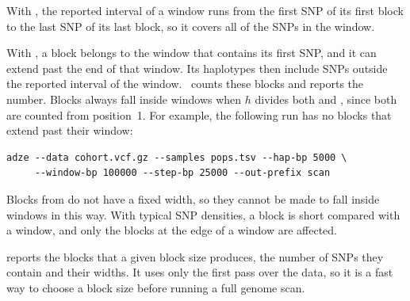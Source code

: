 With , the reported interval of a window runs from the
first SNP of its first block to the last SNP of its last block, so it covers
all of the SNPs in the window.

With , a block belongs to the window that contains its first
SNP, and it can extend past the end of that window. Its haplotypes then
include SNPs outside the reported interval of the window. \prog\ counts these
blocks and reports the number. Blocks always fall inside windows when
 $h$ divides both  and ,
since both are counted from position~1. For example, the following run has no
blocks that extend past their window:

\begin{Verbatim}[frame=single,fontsize=\small]
adze --data cohort.vcf.gz --samples pops.tsv --hap-bp 5000 \
     --window-bp 100000 --step-bp 25000 --out-prefix scan
\end{Verbatim}

\noindent Blocks from  do not have a fixed width, so they
cannot be made to fall inside windows in this way. With typical SNP densities,
a block is short compared with a window, and only the blocks at the edge of a
window are affected.

 reports the blocks that a given block size produces, the
number of SNPs they contain and their widths. It uses only the first pass over
the data, so it is a fast way to choose a block size before running a full
genome scan.
